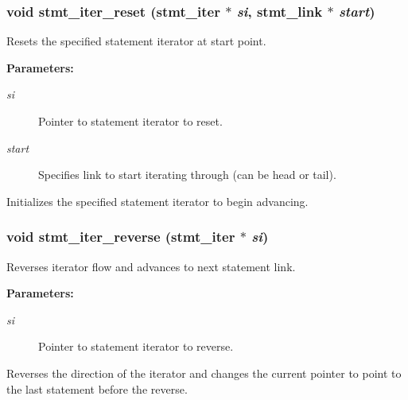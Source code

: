 \subsubsection{\setlength{\rightskip}{0pt plus 5cm}void stmt\_\-iter\_\-reset ({\bf stmt\_\-iter} $\ast$ {\em si}, {\bf stmt\_\-link} $\ast$ {\em start})}\label{iter_8h_a0}


Resets the specified statement iterator at start point.

\begin{Desc}
\item[{\bf Parameters: }]\par
\begin{description}
\item[
{\em si}]Pointer to statement iterator to reset. \item[
{\em start}]Specifies link to start iterating through (can be head or tail).

\end{description}
\end{Desc}
Initializes the specified statement iterator to begin advancing. 
\subsubsection{\setlength{\rightskip}{0pt plus 5cm}void stmt\_\-iter\_\-reverse ({\bf stmt\_\-iter} $\ast$ {\em si})}\label{iter_8h_a2}


Reverses iterator flow and advances to next statement link.

\begin{Desc}
\item[{\bf Parameters: }]\par
\begin{description}
\item[
{\em si}]Pointer to statement iterator to reverse.

\end{description}
\end{Desc}
Reverses the direction of the iterator and changes the current pointer to point to the last statement before the reverse. 